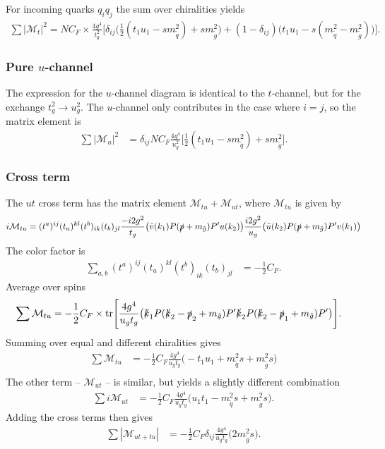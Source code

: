 \documentclass[twoside,english]{uiofysmaster}
\begin{document}
For incoming quarks $q_iq_j$ the sum over chiralities  yields
\begin{align*}
\sum |\mathcal{M}_t|^2 =  NC_F  \times\frac{4 g^4}{t_g^2} \Big[\delta_{ij} \big(\frac{1}{2}(t_1u_1 -sm_{\tilde{q}}^2)+  sm_{\tilde{g}}^2 \big) + (1-\delta_{ij})\big(t_1u_1 -s(m_{\tilde{q}}^2- m_{\tilde{g}}^2) \big)\Big].
\end{align*}

\subsubsection{Pure $u$-channel}

The expression for the $u$-channel diagram is identical to the $t$-channel, but for the exchange $t_g^2 \rightarrow u_g^2$. The $u$-channel only contributes in the case where $i =j$, so the matrix element is
\begin{align*}
\sum |\mathcal{M}_u|^2 &= \delta_{ij} NC_F \frac{4g^4}{u_g^2} \Big[ \frac{1}{2}(t_1u_1-sm_{\tilde{q}}^2) + sm_{\tilde{g}}^2 \Big]. 
\end{align*}


\subsubsection{Cross term}
The $ut$ cross term has the matrix element $\mathcal{M}_{tu}+ \mathcal{M}_{ut}$, where $\mathcal{M}_{tu}$ is given by
\begin{align*}
i \mathcal{M}_{tu} &= (t^a)^{ij}(t_a)^{kl}(t^b)_{ik}(t_b)_{jl} \frac{-i 2 g^2}{t_g}\big( \bar{v} (k_1)  P (\slashed{p} + m_{\tilde{g}}) P'u(k_2) \big)  \frac{i 2 g^2}{u_g} \big( \bar{u} (k_2)  P (\slashed{p} + m_{\tilde{g}}) P' v(k_1) \big)\\
\end{align*}
The color factor is
\begin{align*}
\sum_{a,b}(t^a)^{ij}(t_a)^{kl}(t^b)_{ik}(t_b)_{jl} 
 &= - \frac{1}{2}C_F.
\end{align*}
Average over spins
\begin{align*}
\sum \mathcal{M}_{tu} &= - \frac{1}{2}C_F \times \text{tr}\Bigg[ \frac{4 g^4}{u_gt_g}\big( \slashed{k}_1   P (\slashed{k}_2 - \slashed{p}_2 + m_{\tilde{g}}) P'\slashed{k}_2  P (\slashed{k}_2 -\slashed{p}_1 + m_{\tilde{g}}) P' \big) \Bigg].
\end{align*}
Summing over equal and different chiralities gives
\begin{align*}
\sum  \mathcal{M}_{tu} 
  &= - \frac{1}{2}C_F  \frac{4 g^4}{u_gt_g} \big(
  -   t_1 u_1 + m_{\tilde{q}}^2 s 
+  m_{\tilde{g}}^2 s
  \big)\\
\end{align*}
The other term --  $\mathcal{M}_{ut}$ -- is similar, but yields a slightly different combination
\begin{align*}
\sum i \mathcal{M}_{ut} 
  &= - \frac{1}{2}C_F  \frac{4 g^4}{u_gt_g} \big(
u_1t_1- m_{\tilde{q}}^2s + m_{\tilde{g}}^2s
  \big).
\end{align*}
Adding the cross terms then gives 
\begin{align*}
\sum |\mathcal{M}_{ut+tu}| &= - \frac{1}{2}C_F \delta_{ij}  \frac{4 g^4}{u_gt_g} \big(2 m_{\tilde{g}}^2s   \big).
\end{align*}
\end{document}
